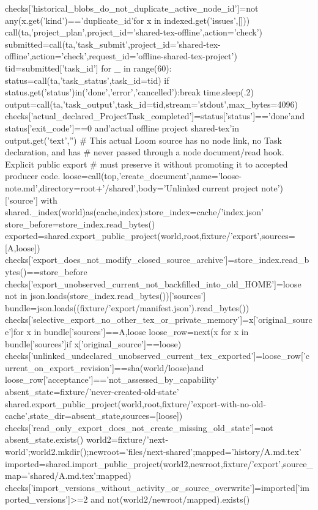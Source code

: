     checks['historical_blobs_do_not_duplicate_active_node_id']=not any(x.get('kind')=='duplicate_id'for x in indexed.get('issues',[]))
    call(ta,'project_plan',project_id='shared-tex-offline',action='check')
    submitted=call(ta,'task_submit',project_id='shared-tex-offline',action='check',request_id='offline-shared-tex-project')
    tid=submitted['task_id']
    for _ in range(60):
        status=call(ta,'task_status',task_id=tid)
        if status.get('status')in('done','error','cancelled'):break
        time.sleep(.2)
    output=call(ta,'task_output',task_id=tid,stream='stdout',max_bytes=4096)
    checks['actual_declared_ProjectTask_completed']=status['status']=='done'and status['exit_code']==0 and'actual offline project shared-tex'in output.get('text','')
    # This actual Loom source has no node link, no Task declaration, and has
    # never passed through a node document/read hook. Explicit public export
    # must preserve it without promoting it to accepted producer code.
    loose=call(top,'create_document',name='loose-note.md',directory=root+'/shared',body='Unlinked current project note\n')['source']
    with shared._index(world)as(cache,index):store_index=cache/'index.json'
    store_before=store_index.read_bytes()
    exported=shared.export_public_project(world,root,fixture/'export',sources=[A,loose])
    checks['export_does_not_modify_closed_source_archive']=store_index.read_bytes()==store_before
    checks['export_unobserved_current_not_backfilled_into_old_HOME']=loose not in json.loads(store_index.read_bytes())['sources']
    bundle=json.loads((fixture/'export/manifest.json').read_bytes())
    checks['selective_export_no_other_tex_or_private_memory']={x['original_source']for x in bundle['sources']}=={A,loose}
    loose_row=next(x for x in bundle['sources']if x['original_source']==loose)
    checks['unlinked_undeclared_unobserved_current_tex_exported']=loose_row['current_on_export_revision']==sha(world/loose)and loose_row['acceptance']=='not_assessed_by_capability'
    absent_state=fixture/'never-created-old-state'
    shared.export_public_project(world,root,fixture/'export-with-no-old-cache',state_dir=absent_state,sources=[loose])
    checks['read_only_export_does_not_create_missing_old_state']=not absent_state.exists()
    world2=fixture/'next-world';world2.mkdir();newroot='files/next-shared';mapped='history/A.md.tex'
    imported=shared.import_public_project(world2,newroot,fixture/'export',source_map={'shared/A.md.tex':mapped})
    checks['import_versions_without_activity_or_source_overwrite']=imported['imported_versions']>=2 and not(world2/newroot/mapped).exists()

